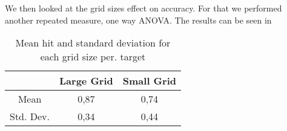 We then looked at the grid sizes effect on accuracy. For that we performed another repeated measure, one way ANOVA. The results can be seen in 

\begin{table}[H]
	\centering
	\begin{tabular}{|c|c|c|}
		\hline
		\rowcolor[HTML]{9B9B9B} 
		& \textbf{Large Grid} & \textbf{Small Grid} \\ \hline
		Mean & 0,87 & 0,74 \\ \hline
		Std. Dev. & 0,34 & 0,44 \\ \hline
		\end{tabular}
		\caption{Mean hit and standard deviation for each grid size per. target}
		\label{tab:meanHitSize}
		\end{table}